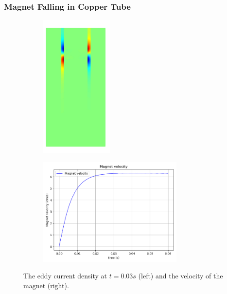 \documentclass[notheorems,serif]{beamer}
\begin{document}
\begin{CJK}{UTF8}{gkai}
\begin{frame}
\end{frame}

\begin{frame}
    \frametitle{Magnet Falling in Copper Tube}
    \begin{figure}[htpb]
    \centering
    \begin{subfigure}[t]{0.49\linewidth}
        \centering
        \includegraphics[width=0.4\textwidth]{../figures/movingmaxwell/J_magnet.jpg}
    \end{subfigure}
    \begin{subfigure}[t]{0.49\linewidth}
        \centering
        \includegraphics[width=0.8\textwidth]{../figures/movingmaxwell/v.png}
    \end{subfigure}
    \caption{The eddy current density at $t=0.03s$ (left) and the velocity of the
    magnet (right).}
\end{figure}
\end{frame}


\end{CJK}
\end{document}
